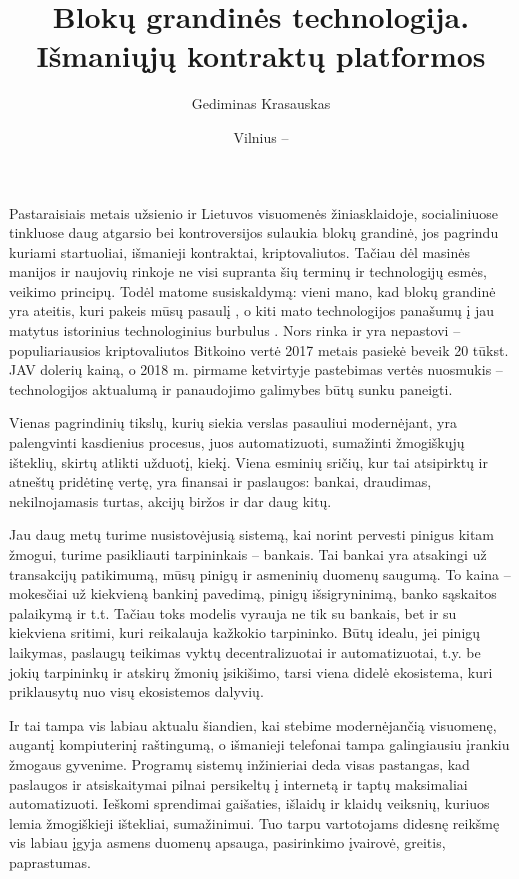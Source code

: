 \documentclass{VUMIFPSkursinis}
\title{Blokų grandinės technologija. Išmaniųjų kontraktų platformos}
\author{Gediminas Krasauskas}
\date{Vilnius – \the\year}
\begin{document}
\maketitle

\tableofcontents

Pastaraisiais metais užsienio ir Lietuvos visuomenės žiniasklaidoje, socialiniuose tinkluose daug atgarsio bei kontroversijos sulaukia blokų grandinė, jos pagrindu kuriami startuoliai, išmanieji kontraktai, kriptovaliutos. Tačiau dėl masinės manijos ir naujovių rinkoje ne visi supranta šių terminų ir technologijų esmės, veikimo principų. Todėl matome susiskaldymą: vieni mano, kad blokų grandinė yra ateitis, kuri pakeis mūsų pasaulį \cite{crosby2016blockchain}, o kiti mato technologijos panašumų į jau matytus istorinius technologinius burbulus \cite{folkinshteyn2015tale}. Nors rinka ir yra nepastovi – populiariausios kriptovaliutos Bitkoino vertė 2017 metais pasiekė beveik 20 tūkst. JAV dolerių kainą, o 2018 m. pirmame ketvirtyje pastebimas vertės nuosmukis \cite{hale2018futures} – technologijos aktualumą ir panaudojimo galimybes būtų sunku paneigti.

Vienas pagrindinių tikslų, kurių siekia verslas pasauliui modernėjant, yra palengvinti kasdienius procesus, juos automatizuoti, sumažinti žmogiškųjų išteklių, skirtų atlikti užduotį, kiekį. Viena esminių sričių, kur tai atsipirktų ir atneštų pridėtinę vertę, yra finansai ir paslaugos: bankai, draudimas, nekilnojamasis turtas, akcijų biržos ir dar daug kitų.

Jau daug metų turime nusistovėjusią sistemą, kai norint pervesti pinigus kitam žmogui, turime pasikliauti tarpininkais – bankais. Tai bankai yra atsakingi už transakcijų patikimumą, mūsų pinigų ir asmeninių duomenų saugumą. To kaina – mokesčiai už kiekvieną bankinį pavedimą, pinigų išsigryninimą, banko sąskaitos palaikymą ir t.t. Tačiau toks modelis vyrauja ne tik su bankais, bet ir su kiekviena sritimi, kuri reikalauja kažkokio tarpininko. Būtų idealu, jei pinigų laikymas, paslaugų teikimas vyktų decentralizuotai ir automatizuotai, t.y. be jokių tarpininkų ir atskirų žmonių įsikišimo, tarsi viena didelė ekosistema, kuri priklausytų nuo visų ekosistemos dalyvių. 

Ir tai tampa vis labiau aktualu šiandien, kai stebime modernėjančią visuomenę, augantį kompiuterinį raštingumą, o išmanieji telefonai tampa galingiausiu įrankiu žmogaus gyvenime. Programų sistemų inžinieriai deda visas pastangas, kad paslaugos ir atsiskaitymai pilnai persikeltų į internetą ir taptų maksimaliai automatizuoti. Ieškomi sprendimai gaišaties, išlaidų ir klaidų veiksnių, kuriuos lemia žmogiškieji ištekliai, sumažinimui. Tuo tarpu vartotojams didesnę reikšmę vis labiau įgyja asmens duomenų apsauga, pasirinkimo įvairovė, greitis, paprastumas.
\end{document}
